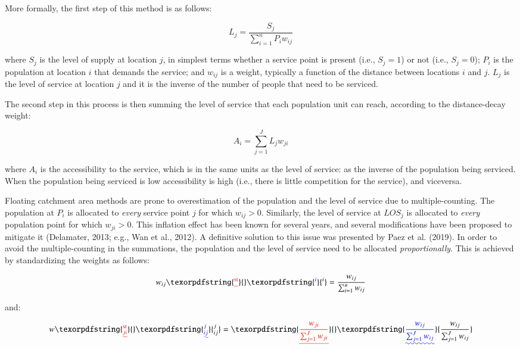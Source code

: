\documentclass[]{elsarticle} %
\providecommand{\DIFaddtex}[1]{{\protect\color{blue}\uwave{#1}}} %
\providecommand{\DIFdeltex}[1]{{\protect\color{red}\sout{#1}}}                      %
\providecommand{\DIFaddbegin}{} %
\providecommand{\DIFaddend}{} %
\providecommand{\DIFdelbegin}{} %
\providecommand{\DIFdelend}{} %
\providecommand{\DIFadd}[1]{\texorpdfstring{\DIFaddtex{#1}}{#1}} %
\providecommand{\DIFdel}[1]{\texorpdfstring{\DIFdeltex{#1}}{}} %
\newcommand{\DIFscaledelfig}{0.5}
\newlength{\DIFdelgraphicswidth} %
\newlength{\DIFdelgraphicsheight} %
\newcommand{\DIFaddincludegraphics}[2][]{{\color{blue}\fbox{\DIFOincludegraphics[#1]{#2}}}} %
\newcommand{\DIFdelincludegraphics}[2][]{%
\sbox{\DIFdelgraphicsbox}{\DIFOincludegraphics[#1]{#2}}%
\settoboxwidth{\DIFdelgraphicswidth}{\DIFdelgraphicsbox} %
\settoboxtotalheight{\DIFdelgraphicsheight}{\DIFdelgraphicsbox} %
\scalebox{\DIFscaledelfig}{%
\parbox[b]{\DIFdelgraphicswidth}{\usebox{\DIFdelgraphicsbox}\\[-\baselineskip] \rule{\DIFdelgraphicswidth}{0em}}\llap{\resizebox{\DIFdelgraphicswidth}{\DIFdelgraphicsheight}{%
\setlength{\unitlength}{\DIFdelgraphicswidth}%
\begin{picture}(1,1)%
\thicklines\linethickness{2pt} %
{\color[rgb]{1,0,0}\put(0,0){\framebox(1,1){}}}%
{\color[rgb]{1,0,0}\put(0,0){\line( 1,1){1}}}%
{\color[rgb]{1,0,0}\put(0,1){\line(1,-1){1}}}%
\end{picture}%
}\hspace*{3pt}}} %
} %
\DeclareRobustCommand{\DIFaddbegin}{\DIFOaddbegin \let\includegraphics\DIFaddincludegraphics} %
\DeclareRobustCommand{\DIFaddend}{\DIFOaddend \let\includegraphics\DIFOincludegraphics} %
\DeclareRobustCommand{\DIFdelbegin}{\DIFOdelbegin \let\includegraphics\DIFdelincludegraphics} %
\DeclareRobustCommand{\DIFdelend}{\DIFOaddend \let\includegraphics\DIFOincludegraphics} %
\begin{document}
More formally, the first step of this method is as follows:
\DIFaddbegin 

\DIFaddend \[
L_j = \frac{S_j}{\sum_{i=1}^nP_iw_{ij}}
\]

\noindent where \(S_j\) is the level of supply at location \(j\), in
simplest terms whether a service point is present (i.e., \(S_j=1\)) or
not (i.e., \(S_j=0\)); \(P_i\) is the population at location \(i\) that
demands the service; and \(w_{ij}\) is a weight, typically a function of
the distance between locations \(i\) and \(j\). \(L_j\) is the level of
service at location \(j\) and it is the inverse of the number of people
that need to be serviced.

The second step in this process is then summing the level of service
that each population unit can reach, according to the distance-decay
weight:
\DIFaddbegin 

\DIFaddend \[
A_i = \sum_{j=1}^JL_jw_{ji}
\]

\noindent where \(A_i\) is the accessibility to the service, which is in
the same units as the level of service: as the inverse of the population
being serviced. When the population being serviced is low accessibility
is high (i.e., there is little competition for the service), and
viceversa.

Floating catchment area methods are prone to overestimation of the
population and the level of service due to multiple-counting. The
population at \(P_i\) is allocated to \emph{every} service point \(j\)
for which \(w_{ij}>0\). Similarly, the level of service at \(LOS_j\) is
allocated to \emph{every} population point for which \(w_{ji}>0\). This
inflation effect has been known for several years, and several
modifications have been proposed to mitigate it (Delamater, 2013; e.g.,
Wan et al., 2012). A definitive solution to this issue was presented by
Paez et al. (2019). In order to avoid the multiple-counting in the
summations, the population and the level of service need to be allocated
\emph{proportionally}. This is achieved by standardizing the weights as
follows:
\DIFaddbegin 

\DIFaddend \[
w_{ij}\DIFdelbegin \DIFdel{^\text{st} }\DIFdelend \DIFaddbegin \DIFadd{^i }\DIFaddend = \frac{w_{ij}}{\sum_{i=1}^nw_{ij}}
\]
\DIFaddbegin 

\DIFaddend \noindent and:
\DIFaddbegin 

\DIFaddend \[
w\DIFdelbegin \DIFdel{_{ji}^\text{st} }\DIFdelend \DIFaddbegin \DIFadd{_{ij}^j }\DIFaddend = \DIFdelbegin \DIFdel{\frac{w_{ji}}{\sum_{j=1}^Jw_{ji}}
}\DIFdelend \DIFaddbegin \DIFadd{\frac{w_{ij}}{\sum_{j=1}^Jw_{ij}}
}\DIFaddend \]
\end{document}
